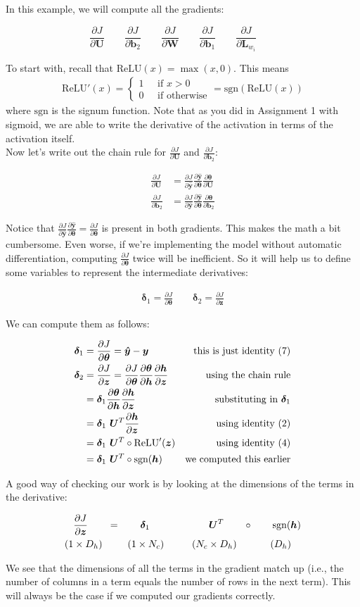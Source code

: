\documentclass{article}[11pt]
\newcommand{\bW} { \bm{W} }
\newcommand{\bU} { \bm{U} }
\newcommand{\bb} { \bm{b} }
\newcommand{\bz} { \bm{z} }
\newcommand{\by} { \bm{y} }
\newcommand{\yhat} { \bm{\hat{y}} }
\newcommand{\btheta} { \bm{\theta} }
\newcommand{\bh} { \bm{h} }
\newcommand{\bL} { \bm{L} }
\newcommand{\bdelta} { \bm{\delta} }
\newcommand{\relu} { \text{ReLU} }
\newcommand{\sgn} { \text{sgn} }
\newcommand{\alns}[1] {
	\begin{align*} #1 \end{align*}
}
\newcommand{\pd}[2] {
 \frac{\partial #1}{\partial #2}
}
\begin{document}
In this example, we will compute all the gradients:

\[
\frac{\partial J}{\partial \bU} \quad\quad
\frac{\partial J}{\partial \bb_2} \quad\quad
\frac{\partial J}{\partial \bW} \quad\quad
\frac{\partial J}{\partial \bb_1} \quad\quad
\frac{\partial J}{\partial \bL_{w_i}} \quad\quad
\]

To start with, recall that $\relu(x) = \max(x, 0)$. This means 
\begin{align*}
\relu'(x) = \begin{cases}
	1 \phantom{abc} \text{if $x > 0$} \\
	0 \phantom{abc} \text{if otherwise} 
	\end{cases}
	= \sgn(\relu(x))
\end{align*}
where $\sgn$ is the signum function. Note that as you did in Assignment 1 with sigmoid, we are able to write the derivative of the activation in terms of the activation itself. \\

Now let's write out the chain rule for $\pd{J}{\bU}$ and $\pd{J}{\bb_2}$:
\alns{
	\pd{J}{\bU} &= \pd{J}{\yhat}\pd{\yhat}{\btheta}\pd{\btheta}{\bU} \\
	\pd{J}{\bb_2} &= \pd{J}{\yhat}\pd{\yhat}{\btheta}\pd{\btheta}{\bb_2}
}
Notice that $\pd{J}{\yhat}\pd{\yhat}{\btheta} = \pd{J}{\btheta}$ is present in both gradients. This makes the math a bit cumbersome. Even worse, if we're implementing the model without automatic differentiation, computing $\pd{J}{\btheta}$ twice will be inefficient. So it will help us to define some variables to represent the intermediate derivatives:
\alns{
	\bdelta_1 = \pd{J}{\btheta} \quad\quad 
	\bdelta_2 = \pd{J}{\bz}
}
We can compute them as follows:
\alns{
\bdelta_1 &= \pd{J}{\btheta} = \yhat - \by & \text{this is just identity (7)}\\
\bdelta_2 &= \pd{J}{\bz} = \pd{J}{\btheta}\pd{\btheta}{\bh}\pd{\bh}{\bz} & \text{using the chain rule}\\
&= \bdelta_1\pd{\btheta}{\bh}\pd{\bh}{\bz} & \text{substituting in $\bdelta_1$}\\
&= \bdelta_1\ \bU^T \pd{\bh}{\bz} & \text{using identity (2)} \\
&= \bdelta_1\ \bU^T \circ \relu'(\bz) & \text{using identity (4)} \\
&= \bdelta_1\ \bU^T \circ \sgn(\bh) & \text{we computed this earlier} \\
}
A good way of checking our work is by looking at the dimensions of the terms in the derivative:
\alns{
&\pd{J}{\bz} \qquad = \qquad \bdelta_1 \qquad\qquad\qquad \bU^T \qquad \circ \qquad \sgn(\bh) \\
(1 &\times D_h) \hspace{9mm} (1 \times N_c) \hspace{10mm} (N_c \times D_h) \hspace{12mm} (D_h)
}
We see that the dimensions of all the terms in the gradient match up (i.e., the number of columns in a term equals the number of rows in the next term).
This will always be the case if we computed our gradients correctly. \\
\end{document}
